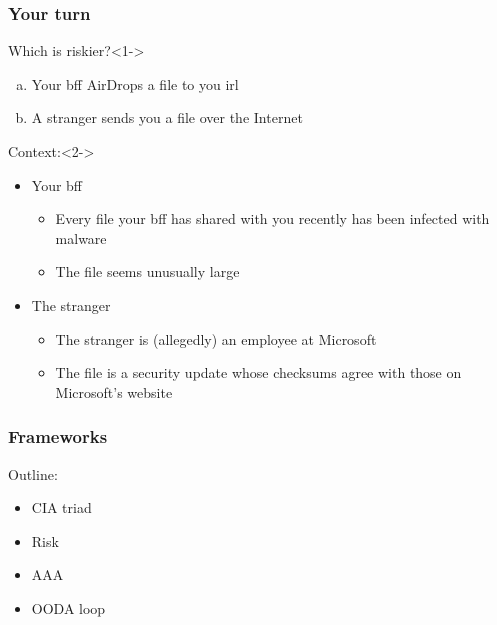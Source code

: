 \documentclass[blue]{beamer}
\begin{document}
\begin{frame}
\frametitle{Your turn}

\begin{block}{Which is riskier?}<1->
\begin{enumerate}[(a)]
  \item Your bff AirDrops a file to you irl
  \item A stranger sends you a file over the Internet
\end{enumerate}
\end{block}

\begin{block}{Context:}<2->
\begin{itemize}
  \item Your bff
  \begin{itemize}
    \item Every file your bff has shared with you recently has been infected with malware
    \item The file seems unusually large
  \end{itemize}
  \item The stranger
  \begin{itemize}
    \item The stranger is (allegedly) an employee at Microsoft
    \item The file is a security update whose checksums agree with those on Microsoft's website
  \end{itemize}
\end{itemize}
\end{block}

\end{frame}



\begin{frame}
\frametitle{Frameworks}

\begin{block}{Outline:}
\begin{itemize}
  \item CIA triad
  \item Risk
  \item AAA
  \item OODA loop
\end{itemize}
\end{block}

\end{frame}
\end{document}

